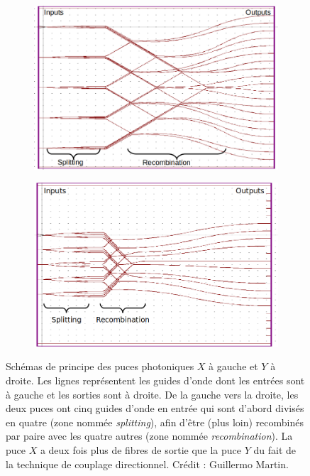 \begin{figure}[ht!]
    \centering
    \begin{subfigure}{0.5\textwidth}
        \centering
        \includegraphics[width=\textwidth]{Figure_Chap2/5TC_X_ChipScheme_rot_l_01.png}
    \end{subfigure}%
    \begin{subfigure}{0.5\textwidth}
        \centering
        \includegraphics[width=\textwidth]{Figure_Chap2/5TC_Y_ChipScheme_rot_l_02.png}
    \end{subfigure}
    \caption[Schémas de principe des puces photoniques $X$ et $Y$.]{Schémas de principe des puces photoniques $X$ à gauche et $Y$ à droite. Les lignes représentent les guides d'onde dont les entrées sont à gauche et les sorties sont à droite. De la gauche vers la droite, les deux puces ont cinq guides d'onde en entrée qui sont d'abord divisés en quatre (zone nommée \textit{splitting}), afin d'être (plus loin) recombinés par paire avec les quatre autres (zone nommée \textit{recombination}). La puce $X$ a deux fois plus de fibres de sortie que la puce $Y$ du fait de la technique de couplage directionnel. Crédit : Guillermo Martin.}
    \label{fig:ChipSchemes}
\end{figure}


